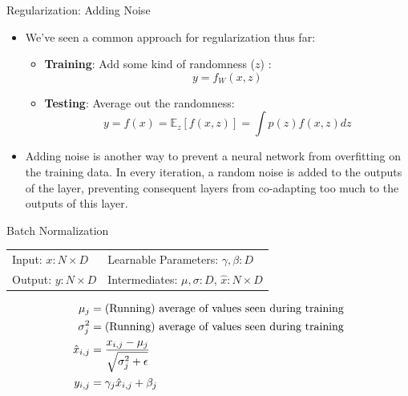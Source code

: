 \begin{frame}{Regularization: Adding Noise}
\begin{itemize}
\item We've seen a common approach for regularization thus far:
\begin{itemize}
	\item \textbf{Training}: Add some kind of randomness ($z$) : $$y = f_W(x, z)$$
	\item \textbf{Testing}: Average out the randomness: $$y=f(x)=\mathbb{E}_z[f(x, z)] = \int p(z)f(x, z)dz$$
\end{itemize}
\pause
\item Adding noise is another way to prevent a neural network from overfitting on the training data.
In every iteration, a random noise is added to the outputs of the layer, preventing consequent layers from co-adapting too much to the outputs of this layer.
\end{itemize}
\end{frame}

\begin{frame}{Batch Normalization}
\begin{tabular}{l l}
Input: $x: N\times D$ & Learnable Parameters: $\gamma, \beta: D$\\
Output: $y: N\times D$ & Intermediates: $\mu, \sigma: D$, $\hat{x}: N \times D$
\end{tabular}
\begin{align*}
\mu_j &= \textup{(Running) average of values seen during training}\\
\sigma^2_j &= \textup{(Running) average of values seen during training}\\
\hat{x}_{i, j} &= \frac{x_{i, j} - \mu_j}{\sqrt{\sigma^2_j + \epsilon}}\\
y_{i,j} &= \gamma_j \hat{x}_{i, j} + \beta_j
\end{align*}
\end{frame}

